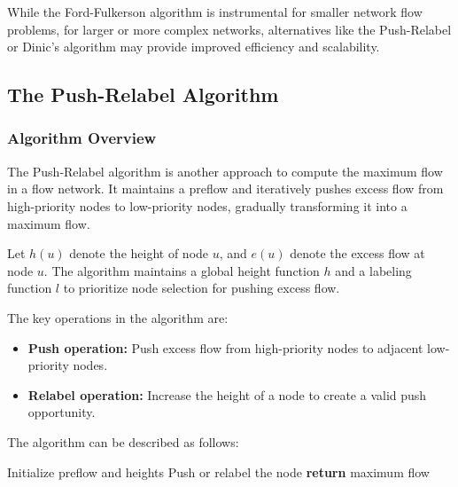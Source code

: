 \documentclass[12pt]{book} %
\begin{document}
While the Ford-Fulkerson algorithm is instrumental for smaller network flow problems, for larger or more complex networks, alternatives like the Push-Relabel or Dinic's algorithm may provide improved efficiency and scalability.


\subsection{The Push-Relabel Algorithm}

\subsubsection{Algorithm Overview}

The Push-Relabel algorithm is another approach to compute the maximum flow in a flow network. It maintains a preflow and iteratively pushes excess flow from high-priority nodes to low-priority nodes, gradually transforming it into a maximum flow.

Let $h(u)$ denote the height of node $u$, and $e(u)$ denote the excess flow at node $u$. The algorithm maintains a global height function $h$ and a labeling function $l$ to prioritize node selection for pushing excess flow.

The key operations in the algorithm are:

\begin{itemize}
    \item \textbf{Push operation:} Push excess flow from high-priority nodes to adjacent low-priority nodes.
    \item \textbf{Relabel operation:} Increase the height of a node to create a valid push opportunity.
\end{itemize}

The algorithm can be described as follows:

\begin{algorithm}
\caption{Push-Relabel Algorithm}
\begin{algorithmic}[1]
    \State Initialize preflow and heights
        \State Push or relabel the node
    \EndWhile
    \State \textbf{return} maximum flow
\EndFunction
\end{algorithmic}
\end{algorithm}
\end{document}
